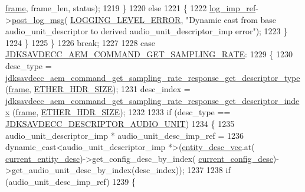 \begin{DoxyCode}
{{      \hyperlink{gst__avb__playbin_8c_ac8e710e0b5e994c0545d75d69868c6f0}{frame}, frame\_len, status);
1219             \}
1220             \textcolor{keywordflow}{else}
1221             \{
1222                 \hyperlink{namespaceavdecc__lib_acbe3e2a96ae6524943ca532c87a28529}{log\_imp\_ref}->\hyperlink{classavdecc__lib_1_1log_a68139a6297697e4ccebf36ccfd02e44a}{post\_log\_msg}(
      \hyperlink{namespaceavdecc__lib_a501055c431e6872ef46f252ad13f85cdaf2c4481208273451a6f5c7bb9770ec8a}{LOGGING\_LEVEL\_ERROR}, \textcolor{stringliteral}{"Dynamic cast from base audio\_unit\_descriptor to derived
       audio\_unit\_descriptor\_imp error"});
1223             \}
1224         \}
1225     \}
1226     \textcolor{keywordflow}{break};
1227 
1228     \textcolor{keywordflow}{case} \hyperlink{group__command_ga42a1a73d69e78b1a9b5bbe7f24a85317}{JDKSAVDECC\_AEM\_COMMAND\_GET\_SAMPLING\_RATE}:
1229     \{
1230         desc\_type = 
      \hyperlink{group__command__get__sampling__rate__response_gafca42dc2dbc04f4fa5a67d0a77c8c659}{jdksavdecc\_aem\_command\_get\_sampling\_rate\_response\_get\_descriptor\_type}
      (\hyperlink{gst__avb__playbin_8c_ac8e710e0b5e994c0545d75d69868c6f0}{frame}, \hyperlink{namespaceavdecc__lib_a6c827b1a0d973e18119c5e3da518e65ca9512ad9b34302ba7048d88197e0a2dc0}{ETHER\_HDR\_SIZE});
1231         desc\_index = 
      \hyperlink{group__command__get__sampling__rate__response_gada7b78ddb76b1d761c6785a28275227d}{jdksavdecc\_aem\_command\_get\_sampling\_rate\_response\_get\_descriptor\_index}
      (\hyperlink{gst__avb__playbin_8c_ac8e710e0b5e994c0545d75d69868c6f0}{frame}, \hyperlink{namespaceavdecc__lib_a6c827b1a0d973e18119c5e3da518e65ca9512ad9b34302ba7048d88197e0a2dc0}{ETHER\_HDR\_SIZE});
1232 
1233         \textcolor{keywordflow}{if} (desc\_type == \hyperlink{group__descriptor_gab23787344ad4773f6486ee9d4bfa4cd2}{JDKSAVDECC\_DESCRIPTOR\_AUDIO\_UNIT})
1234         \{
1235             audio\_unit\_descriptor\_imp * audio\_unit\_desc\_imp\_ref =
1236                 \textcolor{keyword}{dynamic\_cast<}audio\_unit\_descriptor\_imp *\textcolor{keyword}{>}(\hyperlink{classavdecc__lib_1_1end__station__imp_a72edab41bc56e3c1757944a7df188a3d}{entity\_desc\_vec}.at(
      \hyperlink{classavdecc__lib_1_1end__station__imp_afd78c89df26ba7641e1adb764c0e827d}{current\_entity\_desc})->get\_config\_desc\_by\_index(
      \hyperlink{classavdecc__lib_1_1end__station__imp_a60b1af40d35e8a86b0082c54ab6cb6a8}{current\_config\_desc})->get\_audio\_unit\_desc\_by\_index(desc\_index));
1237 
1238             \textcolor{keywordflow}{if} (audio\_unit\_desc\_imp\_ref)
1239             \{
}}
\end{DoxyCode}
